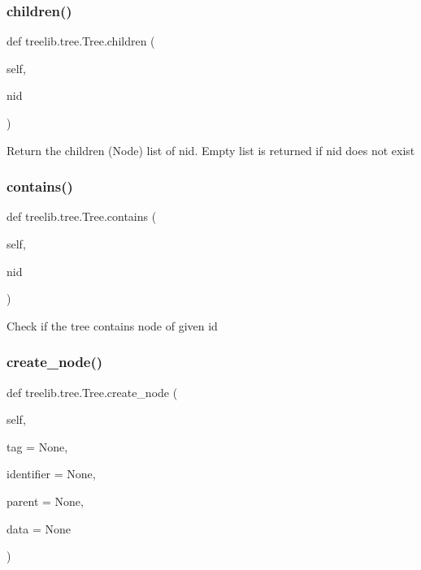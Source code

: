 \subsubsection{\texorpdfstring{children()}{children()}}
{\footnotesize\ttfamily def treelib.\+tree.\+Tree.\+children (\begin{DoxyParamCaption}\item[{}]{self,  }\item[{}]{nid }\end{DoxyParamCaption})}

\begin{DoxyVerb}Return the children (Node) list of nid.
Empty list is returned if nid does not exist
\end{DoxyVerb}
 \mbox{\label{classtreelib_1_1tree_1_1Tree_a6c83066ff561408de6f8670f36ed6ad7}} 
\subsubsection{\texorpdfstring{contains()}{contains()}}
{\footnotesize\ttfamily def treelib.\+tree.\+Tree.\+contains (\begin{DoxyParamCaption}\item[{}]{self,  }\item[{}]{nid }\end{DoxyParamCaption})}

\begin{DoxyVerb}Check if the tree contains node of given id\end{DoxyVerb}
 \mbox{\label{classtreelib_1_1tree_1_1Tree_a4b70a6cf20c1197b1b04e139e7bd4110}} 
\subsubsection{\texorpdfstring{create\+\_\+node()}{create\_node()}}
{\footnotesize\ttfamily def treelib.\+tree.\+Tree.\+create\+\_\+node (\begin{DoxyParamCaption}\item[{}]{self,  }\item[{}]{tag = {\ttfamily None},  }\item[{}]{identifier = {\ttfamily None},  }\item[{}]{parent = {\ttfamily None},  }\item[{}]{data = {\ttfamily None} }\end{DoxyParamCaption})}

